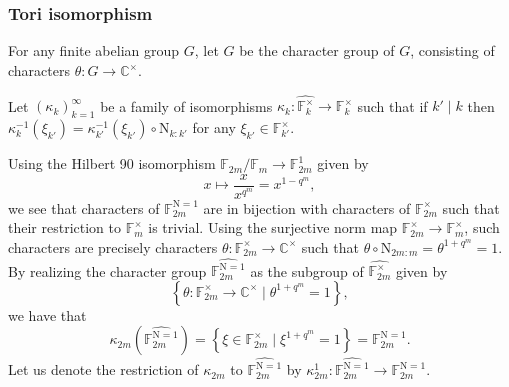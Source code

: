 \documentclass[12pt, reqno]{amsart}
\theoremstyle{definition}
\theoremstyle{definition}
\theoremstyle{definition}
\newcommand{\cComplex}{\mathbb{C}}
\newcommand{\multiplicativegroup}[1]{#1^{\times}}
\newcommand{\FieldNorm}[2]{\mathrm{N}_{#1:#2}}
\newcommand{\aFieldNorm}{\mathrm{N}}
\newcommand{\finiteField}{\mathbb{F}}
\newcommand{\finiteFieldExtension}[1]{\finiteField_{#1}}
\newcommand{\NormOneGroup}[1]{\finiteFieldExtension{#1}^{\aFieldNorm = 1}}
\newcommand{\charactergroup}[1]{\widehat{\multiplicativegroup{\finiteFieldExtension{#1}}}}
\newcommand{\ToriDualToriIsomorphism}{\kappa}
\begin{document}
\subsubsection{Tori isomorphism}

For any finite abelian group $G$, let $\widehat{G}$ be the character group of $G$, consisting of characters $\theta \colon G \to \multiplicativegroup{\cComplex}$.

Let $\left(\ToriDualToriIsomorphism_k\right)_{k=1}^{\infty}$ be a family of isomorphisms $\ToriDualToriIsomorphism_k \colon \charactergroup{k} \to \multiplicativegroup{\finiteFieldExtension{k}}$ such that if $k' \mid k$ then $\ToriDualToriIsomorphism_k^{-1}\left(\xi_{k'}\right) = \ToriDualToriIsomorphism_{k'}^{-1}\left(\xi_{k'}\right) \circ \FieldNorm{k}{k'}$ for any $\xi_{k'} \in \multiplicativegroup{\finiteFieldExtension{k'}}$.

Using the Hilbert 90 isomorphism $\finiteFieldExtension{2m} \slash \finiteFieldExtension{m} \to \finiteFieldExtension{2m}^{1}$ given by $$x \mapsto \frac{x}{x^{q^m}} = x^{1 - q^m},$$ we see that characters of $\NormOneGroup{2m}$ are in bijection with characters of $\multiplicativegroup{\finiteFieldExtension{2m}}$ such that their restriction to $\multiplicativegroup{\finiteFieldExtension{m}}$ is trivial. Using the surjective norm map $\multiplicativegroup{\finiteFieldExtension{2m}} \to \multiplicativegroup{\finiteFieldExtension{m}}$, such characters are precisely characters $\theta \colon \multiplicativegroup{\finiteFieldExtension{2m}} \to \multiplicativegroup{\cComplex}$ such that $\theta \circ \FieldNorm{2m}{m} = \theta^{1 + q^m} = 1$. By realizing the character group $\widehat{\NormOneGroup{2m}}$ as the subgroup of $\charactergroup{2m}$ given by $$\left\{ \theta \colon \multiplicativegroup{\finiteFieldExtension{2m}} \to \multiplicativegroup{\cComplex} \mid \theta^{1+q^m} = 1\right\},$$
we have that $$\ToriDualToriIsomorphism_{2m}\left(\widehat{\NormOneGroup{2m}}\right) = \left\{\xi \in \multiplicativegroup{\finiteFieldExtension{2m}} \mid \xi^{1+q^m} = 1\right\} = \NormOneGroup{2m}.$$
Let us denote the restriction of $\ToriDualToriIsomorphism_{2m}$ to $\widehat{\NormOneGroup{2m}}$ by $\ToriDualToriIsomorphism_{2m}^1 \colon \widehat{\NormOneGroup{2m}} \to \NormOneGroup{2m}$.
\end{document}
